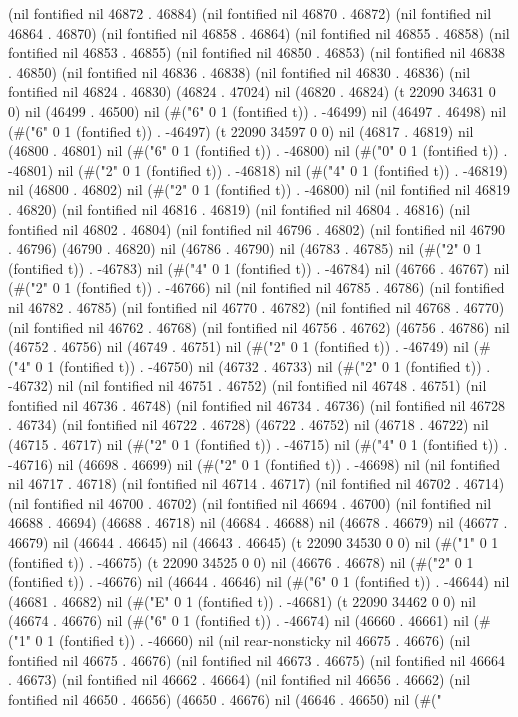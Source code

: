 (nil fontified nil 46872 . 46884) (nil fontified nil 46870 . 46872) (nil fontified nil 46864 . 46870) (nil fontified nil 46858 . 46864) (nil fontified nil 46855 . 46858) (nil fontified nil 46853 . 46855) (nil fontified nil 46850 . 46853) (nil fontified nil 46838 . 46850) (nil fontified nil 46836 . 46838) (nil fontified nil 46830 . 46836) (nil fontified nil 46824 . 46830) (46824 . 47024) nil (46820 . 46824) (t 22090 34631 0 0) nil (46499 . 46500) nil (#("6" 0 1 (fontified t)) . -46499) nil (46497 . 46498) nil (#("6" 0 1 (fontified t)) . -46497) (t 22090 34597 0 0) nil (46817 . 46819) nil (46800 . 46801) nil (#("6" 0 1 (fontified t)) . -46800) nil (#("0" 0 1 (fontified t)) . -46801) nil (#("2" 0 1 (fontified t)) . -46818) nil (#("4" 0 1 (fontified t)) . -46819) nil (46800 . 46802) nil (#("2" 0 1 (fontified t)) . -46800) nil (nil fontified nil 46819 . 46820) (nil fontified nil 46816 . 46819) (nil fontified nil 46804 . 46816) (nil fontified nil 46802 . 46804) (nil fontified nil 46796 . 46802) (nil fontified nil 46790 . 46796) (46790 . 46820) nil (46786 . 46790) nil (46783 . 46785) nil (#("2" 0 1 (fontified t)) . -46783) nil (#("4" 0 1 (fontified t)) . -46784) nil (46766 . 46767) nil (#("2" 0 1 (fontified t)) . -46766) nil (nil fontified nil 46785 . 46786) (nil fontified nil 46782 . 46785) (nil fontified nil 46770 . 46782) (nil fontified nil 46768 . 46770) (nil fontified nil 46762 . 46768) (nil fontified nil 46756 . 46762) (46756 . 46786) nil (46752 . 46756) nil (46749 . 46751) nil (#("2" 0 1 (fontified t)) . -46749) nil (#("4" 0 1 (fontified t)) . -46750) nil (46732 . 46733) nil (#("2" 0 1 (fontified t)) . -46732) nil (nil fontified nil 46751 . 46752) (nil fontified nil 46748 . 46751) (nil fontified nil 46736 . 46748) (nil fontified nil 46734 . 46736) (nil fontified nil 46728 . 46734) (nil fontified nil 46722 . 46728) (46722 . 46752) nil (46718 . 46722) nil (46715 . 46717) nil (#("2" 0 1 (fontified t)) . -46715) nil (#("4" 0 1 (fontified t)) . -46716) nil (46698 . 46699) nil (#("2" 0 1 (fontified t)) . -46698) nil (nil fontified nil 46717 . 46718) (nil fontified nil 46714 . 46717) (nil fontified nil 46702 . 46714) (nil fontified nil 46700 . 46702) (nil fontified nil 46694 . 46700) (nil fontified nil 46688 . 46694) (46688 . 46718) nil (46684 . 46688) nil (46678 . 46679) nil (46677 . 46679) nil (46644 . 46645) nil (46643 . 46645) (t 22090 34530 0 0) nil (#("1" 0 1 (fontified t)) . -46675) (t 22090 34525 0 0) nil (46676 . 46678) nil (#("2" 0 1 (fontified t)) . -46676) nil (46644 . 46646) nil (#("6" 0 1 (fontified t)) . -46644) nil (46681 . 46682) nil (#("E" 0 1 (fontified t)) . -46681) (t 22090 34462 0 0) nil (46674 . 46676) nil (#("6" 0 1 (fontified t)) . -46674) nil (46660 . 46661) nil (#("1" 0 1 (fontified t)) . -46660) nil (nil rear-nonsticky nil 46675 . 46676) (nil fontified nil 46675 . 46676) (nil fontified nil 46673 . 46675) (nil fontified nil 46664 . 46673) (nil fontified nil 46662 . 46664) (nil fontified nil 46656 . 46662) (nil fontified nil 46650 . 46656) (46650 . 46676) nil (46646 . 46650) nil (#("
